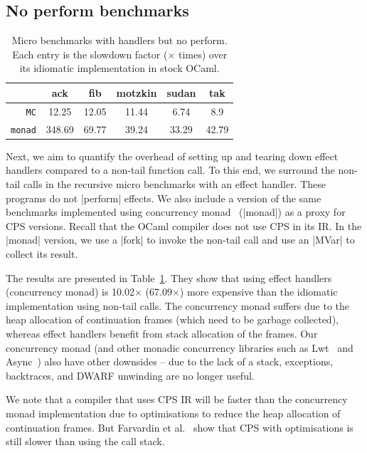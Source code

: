 \documentclass[sigplan,10pt,review,anonymous]{acmart}\settopmatter{printfolios=true,printccs=false,printacmref=false}
\begin{document}
\vspace{-3mm}
\subsection{No perform benchmarks}

\begin{table}
\caption{Micro benchmarks with handlers but no perform. Each entry is the
	slowdown factor ($\times$ times) over its idiomatic implementation in stock OCaml.}
\vspace{-3mm}
{
\begin{tabular}{r c c c c c}
	& \textbf{ack} & \textbf{fib} & \textbf{motzkin} & \textbf{sudan} & \textbf{tak} \\ \hline
	\texttt{MC} 	 	& 12.25 & 12.05 & 11.44 & 6.74 & 8.9 \\
	\texttt{monad} 	& 348.69 & 69.77 & 39.24 & 33.29 & 42.79 \\ \hline
\end{tabular}
}
\label{tab:micro_noperform}
	\vspace{-5mm}
\end{table}

Next, we aim to quantify the overhead of setting up and tearing down effect
handlers compared to a non-tail function call. To this end, we surround the
non-tail calls in the recursive micro benchmarks with an effect handler. These
programs do not |perform| effects. We also include a version of the same
benchmarks implemented using concurrency monad~\cite{Claessen99} (|monad|) as a
proxy for CPS versions. Recall that the OCaml compiler does not use CPS in its IR.
In the |monad| version, we use a |fork| to invoke the non-tail call and use an
|MVar| to collect its result.

The results are presented in Table~\ref{tab:micro_noperform}. They show that
using effect handlers (concurrency monad) is 10.02$\times$ (67.09$\times$) more
expensive than the idiomatic implementation using non-tail calls. The concurrency
monad suffers due to the heap allocation of continuation frames (which need to
be garbage collected), whereas effect handlers benefit from stack allocation of
the frames. Our concurrency monad (and other monadic concurrency libraries such
as Lwt~\cite{lwt} and Async~\cite{async}) also have other downsides -- due to
the lack of a stack, exceptions, backtraces, and DWARF unwinding are no longer
useful.

We note that a compiler that uses CPS IR will be faster than the concurrency
monad implementation due to optimisations to reduce the heap allocation of
continuation frames. But Farvardin et al.~\cite{Farvardin20} show that CPS with
optimisations is still slower than using the call stack.
\end{document}
